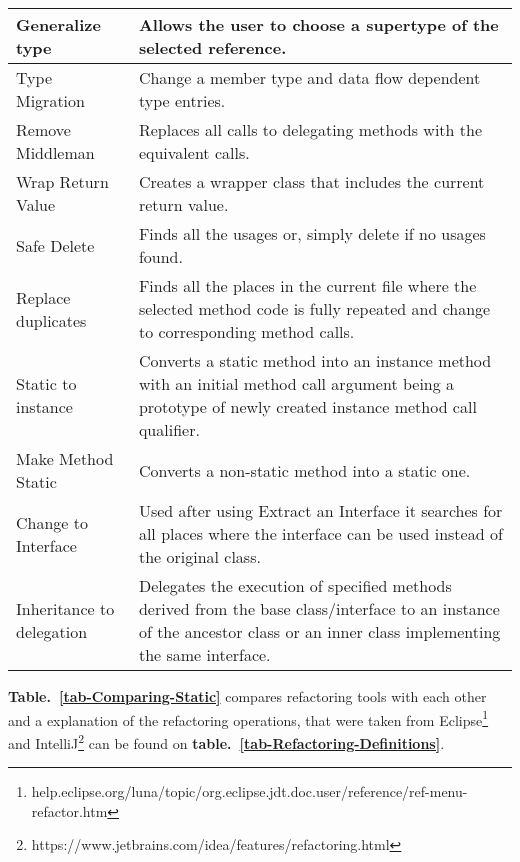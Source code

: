 \begin{table}[htbp]
\begin{tabular}{ |p{2.95cm}| p{9.15cm}|}
Generalize type           & Allows the user to choose a supertype of the selected reference.                                                                                                          \\ \hline
Type Migration            & Change a member type and data flow dependent type entries.                                                                                                                \\ \hline
Remove Middleman          & Replaces all calls to delegating methods with the equivalent calls.                                                                                                       \\ \hline
Wrap Return Value         & Creates a wrapper class that includes the current return value.                                                                                                           \\ \hline
Safe Delete               & Finds all the usages or, simply delete if no usages found.                                                                                                                \\ \hline
Replace duplicates        & Finds all the places in the current file where the selected method code is fully repeated and change to corresponding method calls.                                      \\ \hline
Static to instance        & Converts a static method into an instance method with an initial method call argument being a prototype of newly created instance method call qualifier.                  \\ \hline
Make Method Static        & Converts a non-static method into a static one.                                                                                                                           \\ \hline
Change to Interface       & Used after using Extract an Interface it searches for all places where the interface can be used instead of the original class.                                             \\ \hline
Inheritance to delegation & Delegates the execution of specified methods derived from the base class/interface to an instance of the ancestor class or an inner class implementing the same interface. \\ \hline
\end{tabular}
\end{table}
{\bf Table.~\ref{tab-Comparing-Static}} compares refactoring tools with each other and a explanation of the refactoring operations, that were taken from Eclipse\footnote{help.eclipse.org/luna/topic/org.eclipse.jdt.doc.user/reference/ref-menu-refactor.htm} and IntelliJ\footnote{https://www.jetbrains.com/idea/features/refactoring.html} can be found on {\bf table.~\ref{tab-Refactoring-Definitions}}.

